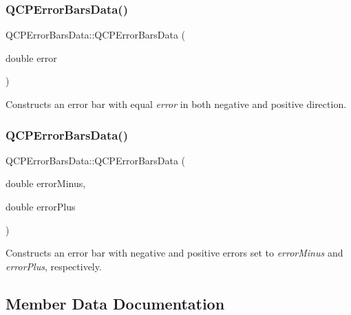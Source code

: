 \subsubsection{\texorpdfstring{Q\+C\+P\+Error\+Bars\+Data()}{QCPErrorBarsData()}\hspace{0.1cm}{\footnotesize\ttfamily [2/3]}}
{\footnotesize\ttfamily Q\+C\+P\+Error\+Bars\+Data\+::\+Q\+C\+P\+Error\+Bars\+Data (\begin{DoxyParamCaption}\item[{double}]{error }\end{DoxyParamCaption})\hspace{0.3cm}{\ttfamily [explicit]}}

Constructs an error bar with equal {\itshape error} in both negative and positive direction. \mbox{\label{class_q_c_p_error_bars_data_a7c61e42d87aea3312262d5429bc28387}} 
\subsubsection{\texorpdfstring{Q\+C\+P\+Error\+Bars\+Data()}{QCPErrorBarsData()}\hspace{0.1cm}{\footnotesize\ttfamily [3/3]}}
{\footnotesize\ttfamily Q\+C\+P\+Error\+Bars\+Data\+::\+Q\+C\+P\+Error\+Bars\+Data (\begin{DoxyParamCaption}\item[{double}]{error\+Minus,  }\item[{double}]{error\+Plus }\end{DoxyParamCaption})}

Constructs an error bar with negative and positive errors set to {\itshape error\+Minus} and {\itshape error\+Plus}, respectively. 

\subsection{Member Data Documentation}
\mbox{\label{class_q_c_p_error_bars_data_af8aaea160e52c14c57836224ee78020b}} 
